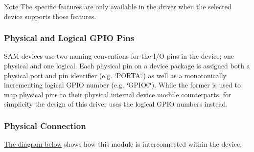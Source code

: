 \begin{DoxyNote}{Note}
The specific features are only available in the driver when the selected device supports those features.
\end{DoxyNote}
\hypertarget{group__asfdoc__sam0__port__group_asfdoc_sam0_port_module_overview_pin_numbering}{}\subsubsection{Physical and Logical G\+P\+I\+O Pins}\label{group__asfdoc__sam0__port__group_asfdoc_sam0_port_module_overview_pin_numbering}
S\+A\+M devices use two naming conventions for the I/\+O pins in the device; one physical and one logical. Each physical pin on a device package is assigned both a physical port and pin identifier (e.\+g. \char`\"{}\+P\+O\+R\+T\+A.\char`\"{}) as well as a monotonically incrementing logical G\+P\+I\+O number (e.\+g. \char`\"{}\+G\+P\+I\+O0\char`\"{}). While the former is used to map physical pins to their physical internal device module counterparts, for simplicity the design of this driver uses the logical G\+P\+I\+O numbers instead.\hypertarget{group__asfdoc__sam0__port__group_asfdoc_sam0_port_module_overview_physical}{}\subsubsection{Physical Connection}\label{group__asfdoc__sam0__port__group_asfdoc_sam0_port_module_overview_physical}
\hyperlink{group__asfdoc__sam0__port__group_asfdoc_sam0_port_module_int_connections}{The diagram below} shows how this module is interconnected within the device.

